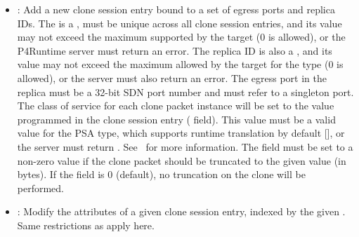\documentclass[11pt]{article}
\begin{document}
{\begin{itemize}[noitemsep,topsep=\mdcompacttopsep]
\item{}: Add a new clone session entry bound to a set of egress ports and
replica IDs. The  is a , must be unique across all clone
session entries, and its value may not exceed the maximum supported by the
target (0 is allowed), or the P4Runtime server must return an
 error. The replica  ID is also a , and
its value may not exceed the maximum allowed by the target for the
 type (0 is allowed), or the server must also return an
 error. The egress port in the replica must be a 32-bit SDN
port number and must refer to a singleton port. The class of service for each
clone packet instance will be set to the value programmed in the clone session
entry ( field). This value must be a valid value for the PSA
 type, which supports runtime translation by default
[], or the server must return . See~ for more
information. The  field must be set to a non-zero value
if the clone packet should be truncated to the given value (in bytes). If the
 field is 0 (default), no truncation on the clone will be
performed.%

\item{}: Modify the attributes of a given clone session entry, indexed by the
given . Same restrictions as  apply here.%


\end{itemize}}
\end{document}
